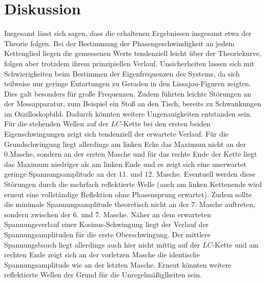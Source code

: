 \section{Diskussion}
\label{sec:Diskussion}
Insgesamt lässt sich sagen, dass die erhaltenen Ergebnissen insgesamt etwa der Theorie folgen.
Bei der Bestimmung der Phasengeschwindigkeit an jedem Kettenglied liegen die gemessenen Werte tendenziell leicht über der Theoriekurve, folgen aber trotzdem ihrem prinzipiellen Verlauf.
Unsicherheiten lassen sich mit Schwierigkeiten beim Bestimmen der Eigenfrequenzen des Systems, da sich teilweise nur geringe Entartungen zu Geraden in den Lissajou-Figuren zeigten. Dies galt besonders für große Frequenzen. Zudem führten leichte Störungen an der Messapparatur, zum Beispiel ein Stoß an den Tisch, bereits zu Schwankungen im Oszilloskopbild. Dadurch könnten weitere Ungenauigkeiten entstanden sein.
Für die stehenden Wellen auf der $LC$-Kette bei den ersten beiden Eigenschwingungen zeigt sich tendenziell der erwartete Verlauf.
Für die Grundschwingung liegt allerdings am linken Ecke das Maximum nicht an der 0.Masche, sondern an der ersten Masche und für das rechte Ende der Kette liegt das Maximum niedriger als am linken Ende und es zeigt sich eine unerwartet geringe Spannungsamplitude an der 11. und 12. Masche.
Eventuell werden diese Störungen durch die mehrfach reflektierte Welle (auch am linken Kettenende wird erneut eine vollständige Reflektion ohne Phasensprung erwartet).
Zudem sollte die minimale Spannungsamplitude theoretisch nicht an der 7. Masche auftreten, sondern zwischen der 6. und 7. Masche.
Näher an dem erwarteten Spannungsverlauf einer Kosinus-Schwingung liegt der Verlauf der Spannungsamplituden für die erste Oberschwingung.
Der mittlere Spannungsbauch liegt allerdings auch hier nicht mittig auf der $LC$-Kette und am rechten Ende zeigt sich an der vorletzen Masche die identische Spannungsamplitude wie an der letzten Masche.
Erneut könnten weitere reflektierte Wellen der Grund für die Unregelmäßiglkeiten sein.
